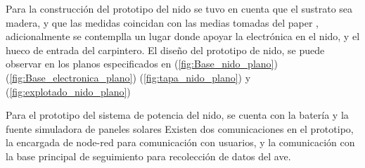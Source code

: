 %

Para la construcción del prototipo del nido se tuvo en cuenta que el sustrato sea madera, y que las medidas coincidan con las medias tomadas del paper \cite{ref:varepsilon_madera}, adicionalmente se contemplla un lugar donde apoyar la electrónica en el nido, y el hueco de entrada del carpintero.
El diseño del prototipo de nido, se puede observar en los planos especificados en (\ref{fig:Base_nido_plano}) (\ref{fig:Base_electronica_plano}) (\ref{fig:tapa_nido_plano}) y (\ref{fig:explotado_nido_plano}) 
\TBC
{}
\TBC

Para el prototipo del sistema de potencia del nido, se cuenta con la batería \TBC y la fuente simuladora de paneles solares \TBC 
{}
Existen dos comunicaciones en el prototipo, la encargada de node-red para comunicación con usuarios, y la comunicación con la base principal de seguimiento para recolección de datos del ave.

